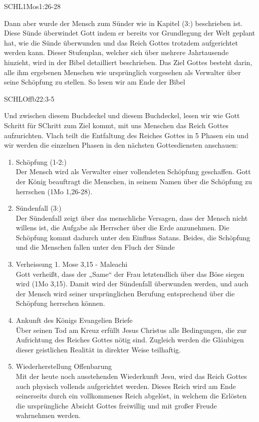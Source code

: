 \documentclass{../../inc/mybib}
\begin{document}
\begin{spacing}{1.5}
\begin{bibelbox}{SCHL}{1Mos}{1:26-28}
    \end{bibelbox}
   Dann aber wurde der Mensch zum Sünder wie in Kapitel (3:) beschrieben ist. Diese Sünde überwindet Gott indem er bereits vor Grundlegung der Welt geplant hat, wie die Sünde überwunden und das Reich
   Gottes trotzdem aufgerichtet werden kann. Dieser Stufenplan, welcher sich über mehrere Jahrtausende hinzieht, wird in der Bibel detailliert beschrieben. Das Ziel Gottes besteht darin, alle ihm ergebenen Menschen wie ursprünglich vorgesehen als Verwalter über seine Schöpfung zu stellen. So lesen wir am Ende der Bibel
   \begin{bibelbox}{SCHL}{Offb}{22:3-5}

   \end{bibelbox}
   Und zwischen diesem Buchdeckel und diesem Buchdeckel, lesen wir wie Gott Schritt für SChritt zum Ziel kommt, mit uns Menschen das Reich Gottes aufzurichten.
   Vlach teilt die Entfaltung des Reiches Gottes in 5 Phasen ein und wir werden die einzelnen Phasen in den nächsten Gottesdiensten anschauen:
   
   \begin{enumerate}
    \item Schöpfung (1-2:)\\
     Der Mensch wird als Verwalter einer vollendeten Schöpfung geschaffen. Gott der König 
beauftragt die Menschen, in seinem Namen über die Schöpfung zu herrschen (1Mo 
1,26-28). 
    \item Sündenfall (3:)\\
    Der Sündenfall zeigt über das menschliche Versagen, dass der Mensch nicht willens ist, 
die Aufgabe als Herrscher über die Erde anzunehmen. Die Schöpfung kommt dadurch 
unter den Einfluss Satans. Beides, die Schöpfung und die Menschen fallen unter den 
Fluch der Sünde
    \item Verheissung 1. Mose 3,15 - Maleachi\\
    Gott verheißt, dass der „Same“ der Frau letztendlich über das Böse siegen wird (1Mo 
3,15). Damit wird der Sündenfall überwunden werden, und auch der Mensch wird 
seiner ursprünglichen Berufung entsprechend über die Schöpfung herrschen können.
    \item Ankunft des Königs Evangelien Briefe\\
     Über seinen Tod am Kreuz erfüllt Jesus Christus alle Bedingungen, die zur Aufrichtung 
des Reiches Gottes nötig sind. Zugleich werden die Gläubigen dieser geistlichen 
Realität in direkter Weise teilhaftig. 
    \item Wiederherstellung Offenbarung\\
     Mit der heute noch ausstehenden Wiederkunft Jesu, wird das Reich Gottes auch 
physisch vollends aufgerichtet werden. Dieses Reich wird am Ende seinerseits durch ein 
 vollkommenes Reich abgelöst, in welchem die Erlösten die ursprüngliche Absicht 
Gottes freiwillig und mit großer Freude wahrnehmen werden.
   \end{enumerate}


\end{spacing}
\end{document}
